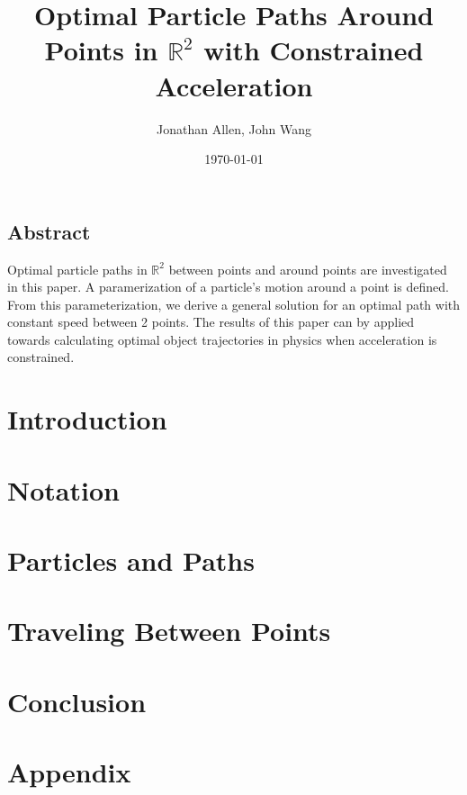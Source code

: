 \documentclass[12pt]{amsart}   %
\newcommand{\R}{\mathbb R}
\begin{document}
\graphicspath{ {figures/} }

\title[Optimal Paths in R2]{Optimal Particle Paths Around Points in $\R^2$ with Constrained Acceleration} 
 
\author{Jonathan Allen, John Wang}
\date{\today}

\maketitle

\subsection*{Abstract}

Optimal particle paths in $\R^2$ between points and around points are investigated in this paper. A paramerization of a particle's motion around a point is defined. From this parameterization, we derive a general solution for an optimal path with constant speed between 2 points. The results of this paper can by applied towards calculating optimal object trajectories in physics when acceleration is constrained. 

\section{Introduction}


\section{Notation}


\section{Particles and Paths}


\section{Traveling Between Points}


\section{Conclusion}


\section*{Appendix}



\end{document}
